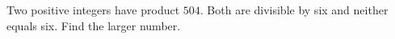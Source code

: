 Two positive integers have product $504$. Both are divisible by six and neither equals six. Find the larger number.
